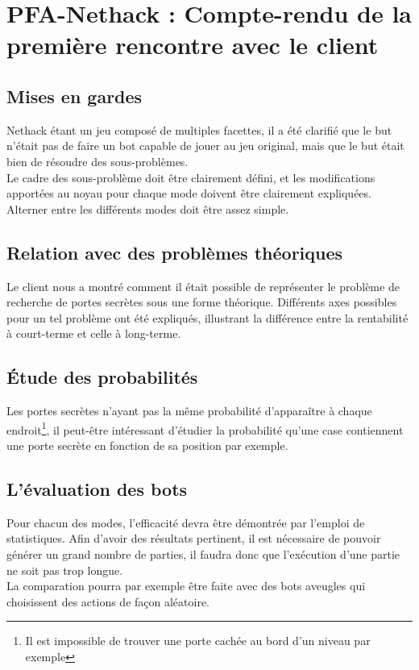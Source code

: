 \documentclass{article}
\begin{document}
\section*{PFA-Nethack : Compte-rendu de la première rencontre avec le client}


\subsection*{Mises en gardes}
Nethack étant un jeu composé de multiples facettes, il a été clarifié que le but n'était pas de faire un bot capable de jouer au jeu original, mais que le but était bien de résoudre des sous-problèmes.\\
Le cadre des sous-problème doit être clairement défini, et les modifications apportées au noyau pour chaque mode doivent être clairement expliquées.\\
Alterner entre les différents modes doit être assez simple.

\subsection*{Relation avec des problèmes théoriques}
Le client nous a montré comment il était possible de représenter le problème de recherche de portes secrètes sous une forme théorique. Différents axes possibles pour un tel problème ont été expliqués, illustrant la différence entre la rentabilité à court-terme et celle à long-terme.

\subsection*{Étude des probabilités} 
Les portes secrètes n'ayant pas la même probabilité d'apparaître à chaque endroit\footnote{Il est impossible de trouver une porte cachée au bord d'un niveau par exemple}, il peut-être intéressant d'étudier la probabilité qu'une case contiennent une porte secrète en fonction de sa position par exemple.

\subsection*{L'évaluation des bots}
Pour chacun des modes, l'efficacité devra être démontrée par l'emploi de statistiques. Afin d'avoir des résultats pertinent, il est nécessaire de pouvoir générer un grand nombre de parties, il faudra donc que l'exécution d'une partie ne soit pas trop longue.\\
La comparation pourra par exemple être faite avec des bots aveugles qui choisissent des actions de façon aléatoire.
\end{document}
